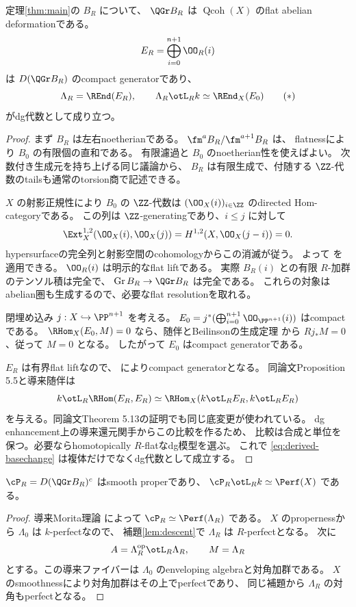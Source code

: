 \begin{proposition}\label{prop:qgr}
 定理\ref{thm:main}の \(B_R\) について、
 \(\QGr B_R\) は \(\operatorname{Qcoh}(X)\) のflat abelian deformationである。
 \[
 E_R=\bigoplus_{i=0}^{n+1}\OO_R(i)
 \]
 は \(D(\QGr B_R)\) のcompact generatorであり、
 \[
 \Lambda_R=\REnd(E_R),\qquad
 \Lambda_R\otL_Rk\simeq\REnd_X(E_0)
 \tag{\(\ast\)}\label{eq:derived-basechange}
 \]
 がdg代数として成り立つ。
\end{proposition}
\begin{proof}
 まず \(B_R\) は左右noetherianである。
 \(\fm^aB_R/\fm^{a+1}B_R\) は、
 flatnessにより \(B_0\) の有限個の直和である。
 有限濾過と \(B_0\) のnoetherian性を使えばよい。
 次数付き生成元を持ち上げる同じ議論から、
 \(B_R\) は有限生成で、付随する \(\ZZ\)-代数のtailsも通常のtorsion商で記述できる。

 \(X\) の射影正規性により \(B_0\) の \(\ZZ\)-代数は
 \((\OO_X(i))_{i\in\ZZ}\) のdirected Hom-categoryである。
 この列は \(\ZZ\)-generatingであり、\(i\le j\) に対して
 \[
 \Ext_X^{1,2}(\OO_X(i),\OO_X(j))
 =H^{1,2}(X,\OO_X(j-i))=0.
 \]
 hypersurfaceの完全列と射影空間のcohomologyからこの消滅が従う。
 よって \cite[Theorem 4.5]{DDL} を適用できる。
 \(\OO_R(i)\) は明示的なflat liftである。
 実際 \(B_R(i)\) との有限 \(R\)-加群のテンソル積は完全で、
 \(\operatorname{Gr}B_R\to\QGr B_R\) は完全である。
 これらの対象はabelian圏も生成するので、必要なflat resolutionを取れる。

 閉埋め込み \(j:X\hookrightarrow\PP^{n+1}\) を考える。
 \(E_0=j^*(\bigoplus_{i=0}^{n+1}\OO_{\PP^{n+1}}(i))\) はcompactである。
 \(\RHom_X(E_0,M)=0\) なら、随伴とBeilinsonの生成定理
 \cite{Beilinson}から \(Rj_*M=0\)、従って \(M=0\) となる。
 したがって \(E_0\) はcompact generatorである。

 \(E_R\) は有界flat liftなので、
 \cite[Propositions 5.8, 5.9]{DDL} によりcompact generatorとなる。
 同論文Proposition 5.5と導来随伴は
 \[
 k\otL_R\RHom(E_R,E_R)
 \simeq\RHom_X(k\otL_RE_R,k\otL_RE_R)
 \]
 を与える。同論文Theorem 5.13の証明でも同じ底変更が使われている。
 dg enhancement上の導来還元関手からこの比較を作るため、
 比較は合成と単位を保つ。必要ならhomotopically \(R\)-flatなdg模型を選ぶ。
 これで \eqref{eq:derived-basechange} は複体だけでなくdg代数として成立する。
\end{proof}

\begin{corollary}\label{cor:smooth-proper}
 \(\cP_R=D(\QGr B_R)^c\) はsmooth properであり、
 \(\cP_R\otL_Rk\simeq\Perf(X)\) である。
\end{corollary}
\begin{proof}
 導来Morita理論 \cite{Keller} によって
 \(\cP_R\simeq\Perf(\Lambda_R)\) である。
 \(X\) のpropernessから \(\Lambda_0\) は \(k\)-perfectなので、
 補題\ref{lem:descent}で \(\Lambda_R\) は \(R\)-perfectとなる。
 次に
 \[
 A=\Lambda_R^{\mathrm{op}}\otL_R\Lambda_R,\qquad M=\Lambda_R
 \]
 とする。この導来ファイバーは \(\Lambda_0\) のenveloping algebraと対角加群である。
 \(X\) のsmoothnessにより対角加群はその上でperfectであり、
 同じ補題から \(\Lambda_R\) の対角もperfectとなる。
\end{proof}

